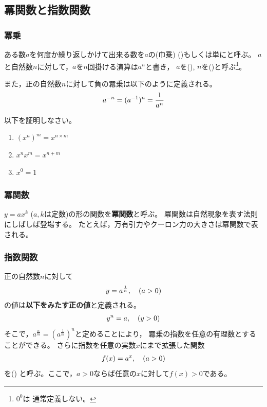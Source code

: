 \documentclass[twocolumn,11pt]{jarticle}
\begin{document}


\subsection{冪関数と指数関数}
\subsubsection{冪乗}

ある数$a$を何度か繰り返しかけて出来る数を$a$の(巾乗)
()もしくは単にと呼ぶ。
$a$と自然数$n$に対して，$a$を$n$回掛ける演算は$a^n$と書き，
$a$を(), 
$n$を()と呼ぶ\footnote{$0^0$は
  通常定義しない。}。

また，正の自然数$n$に対して負の羃乗は以下のように定義される。
\begin{align}
  a^{-n}=(a^{-1})^n=\frac{1}{a^n}\notag
\end{align}

\nquestion
以下を証明しなさい。
\begin{enumerate}
\item $(x^n)^m=x^{n\times m}$
 \item $x^nx^m=x^{n+m}$
\item $x^0=1$
\end{enumerate}

\subsubsection{冪関数}
$y=ax^k$ ($a, k$は定数)の形の関数を\textbf{冪関数}と呼ぶ。
冪関数は自然現象を表す法則にしばしば登場する。
たとえば，万有引力やクーロン力の大きさは冪関数で表される。

\subsubsection{指数関数}
正の自然数$n$に対して
\begin{align}
  y=a^\frac{1}{n}, \quad(a>0)\notag
\end{align}
の値は\textbf{以下をみたす正の値}と定義される。
\begin{align}
  y^n=a,\quad (y>0)\notag
\end{align}
そこで，$a^\frac{n}{m}=\left(a^\frac{1}{m}\right)^n$と定めることにより，
羃乗の指数を任意の有理数とすることができる。
さらに指数を任意の実数$x$にまで拡張した関数
\begin{align}
f(x)=a^x,\quad (a>0)\notag
\end{align}
を()
と呼ぶ。ここで，$a>0$ならば任意の$x$に対して$f(x)>0$である。
\end{document}
